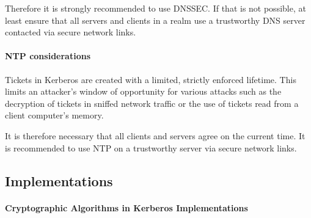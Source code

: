 Therefore it is strongly recommended to use DNSSEC.  If that is not possible, at least ensure that all servers and clients in a realm use a trustworthy DNS server contacted via secure network links.

\paragraph{NTP considerations}
Tickets in Kerberos are created with a limited, strictly enforced lifetime. This limits an attacker's window of opportunity for various attacks such as the decryption of tickets in sniffed network traffic or the use of tickets read from a client computer's memory.

It is therefore necessary that all clients and servers agree on the current time. It is recommended to use NTP on a trustworthy server via secure network links. 

\subsection{Implementations}
\label{subsection:kerberos_implementations}

\paragraph{Cryptographic Algorithms in Kerberos Implementations}

